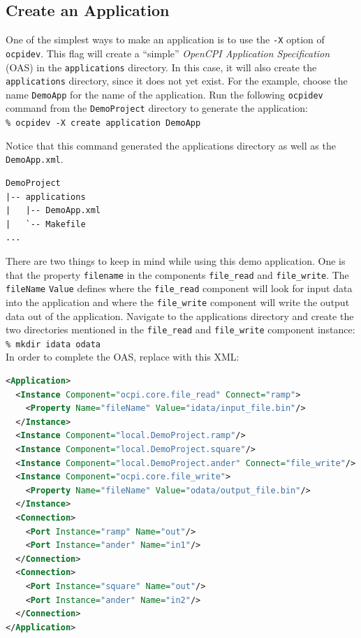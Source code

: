 \subsection{Create an Application}
One of the simplest ways to make an application is to use the \verb+-X+ option of \verb+ocpidev+. This flag will create a ``simple'' \textit{OpenCPI Application Specification} (OAS) in the \verb+applications+ directory. In this case, it will also create the \verb+applications+ directory, since it does not yet exist. For the example, choose the name \verb+DemoApp+ for the name of the application. Run the following \verb+ocpidev+ command from the \verb+DemoProject+ directory to generate the application:\\

\forceindent\verb+% ocpidev -X create application DemoApp+\\
\OcpidevCreate{}

Notice that this command generated the applications directory as well as the \verb+DemoApp.xml+.

\begin{verbatim}
DemoProject
|-- applications
|   |-- DemoApp.xml
|   `-- Makefile
...
\end{verbatim}

There are two things to keep in mind while using this demo application. One is that the property \verb+filename+ in the components \verb+file_read+ and \verb+file_write+. The \verb+fileName+ \verb+Value+ defines where the \verb+file_read+ component will look for input data into the application and where the \verb+file_write+ component will write the output data out of the application. \newline
\bstart
Navigate to the applications directory and create the two directories mentioned in the \verb+file_read+ and \verb+file_write+ component instance:\\

\forceindent\verb+% mkdir idata odata+\\
\bend
\bstart
\label{example:application}
In order to complete the OAS, replace  with this XML:
\begin{lstlisting}[language=xml]
<Application>
  <Instance Component="ocpi.core.file_read" Connect="ramp">
    <Property Name="fileName" Value="idata/input_file.bin"/>
  </Instance>
  <Instance Component="local.DemoProject.ramp"/>
  <Instance Component="local.DemoProject.square"/>
  <Instance Component="local.DemoProject.ander" Connect="file_write"/>
  <Instance Component="ocpi.core.file_write">
    <Property Name="fileName" Value="odata/output_file.bin"/>
  </Instance>
  <Connection>
    <Port Instance="ramp" Name="out"/>
    <Port Instance="ander" Name="in1"/>
  </Connection>
  <Connection>
    <Port Instance="square" Name="out"/>
    <Port Instance="ander" Name="in2"/>
  </Connection>
</Application>
\end{lstlisting}
\bend

